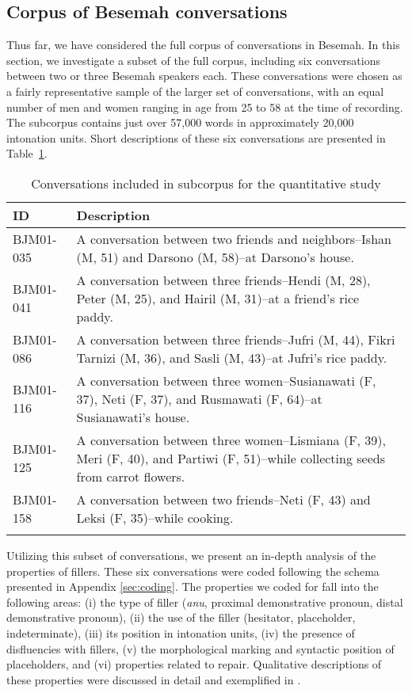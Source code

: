 \documentclass[output=paper,
\ChapterDOI{10.5281/zenodo.15697583}
colorlinks,
citecolor=brown]{langscibook}
\begin{document}
\subsection{Corpus of Besemah conversations}\label{sec:corpus}
Thus far, we have considered the full corpus of conversations in Besemah. In this section, we investigate a subset of the full corpus, including six conversations between two or three Besemah speakers each. These conversations were chosen as a fairly representative sample of the larger set of conversations, with an equal number of men and women ranging in age from 25 to 58 at the time of recording. The subcorpus contains just over 57,000 words in approximately 20,000 intonation units. Short descriptions of these six conversations are presented in Table~\ref{tab:corpus}. 

\begin{table}
\caption{Conversations included in subcorpus for the quantitative study}
\label{tab:corpus}
 \begin{tabularx}{1\textwidth}{l X}
  \lsptoprule
  ID         & Description \\
  \midrule
  BJM01-035
  & A conversation between two friends and neighbors--Ishan (M, 51) and Darsono (M, 58)--at Darsono's house.\\
  BJM01-041 
  & A conversation between three friends--Hendi (M, 28), Peter (M, 25), and Hairil (M, 31)--at a friend's rice paddy.\\

  BJM01-086 
  & A conversation between three friends--Jufri (M, 44), Fikri Tarnizi (M, 36), and Sasli (M, 43)--at Jufri's rice paddy.\\
 
  BJM01-116
  & A conversation between three women--Susianawati (F, 37), Neti (F, 37), and Rusmawati (F, 64)--at Susianawati's house.\\
  BJM01-125
  & A conversation between three women--Lismiana (F, 39), Meri (F, 40), and Partiwi (F, 51)--while collecting seeds from carrot flowers.\\

  BJM01-158 
  & A conversation between two friends--Neti (F, 43) and Leksi (F, 35)--while cooking.\\
  \lspbottomrule
 \end{tabularx}
\end{table}

Utilizing this subset of conversations, we present an in-depth analysis of the properties of fillers. These six conversations were coded following the schema presented in Appendix \ref{sec:coding}. The properties we coded for fall into the following areas: (i) the type of filler (\textit{anu}, proximal demonstrative pronoun, distal demonstrative pronoun), (ii) the use of the filler (hesitator, placeholder, indeterminate), (iii) its position in intonation units, (iv) the presence of disfluencies with fillers, (v) the morphological marking and syntactic position of placeholders, and (vi) properties related to repair. Qualitative descriptions of these properties were discussed in detail and exemplified in .
\end{document}
